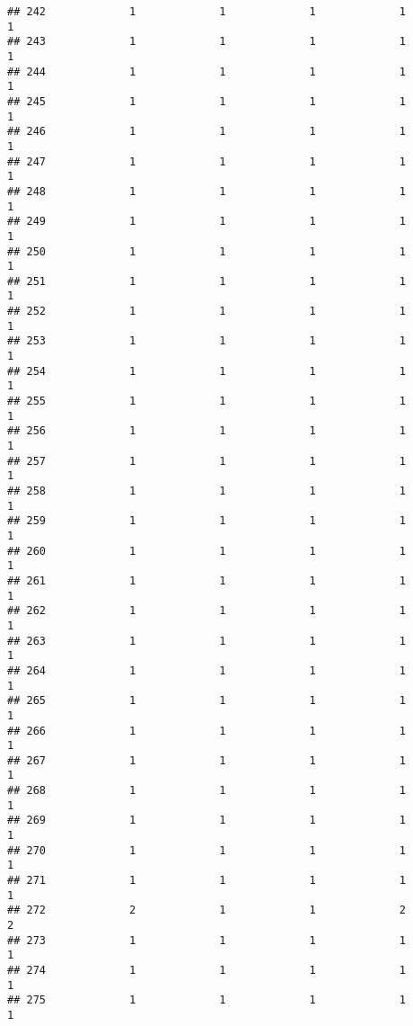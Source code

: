 \documentclass[
]{article}
\begin{document}
\begin{verbatim}
## 242             1             1             1             1             1
## 243             1             1             1             1             1
## 244             1             1             1             1             1
## 245             1             1             1             1             1
## 246             1             1             1             1             1
## 247             1             1             1             1             1
## 248             1             1             1             1             1
## 249             1             1             1             1             1
## 250             1             1             1             1             1
## 251             1             1             1             1             1
## 252             1             1             1             1             1
## 253             1             1             1             1             1
## 254             1             1             1             1             1
## 255             1             1             1             1             1
## 256             1             1             1             1             1
## 257             1             1             1             1             1
## 258             1             1             1             1             1
## 259             1             1             1             1             1
## 260             1             1             1             1             1
## 261             1             1             1             1             1
## 262             1             1             1             1             1
## 263             1             1             1             1             1
## 264             1             1             1             1             1
## 265             1             1             1             1             1
## 266             1             1             1             1             1
## 267             1             1             1             1             1
## 268             1             1             1             1             1
## 269             1             1             1             1             1
## 270             1             1             1             1             1
## 271             1             1             1             1             1
## 272             2             1             1             2             2
## 273             1             1             1             1             1
## 274             1             1             1             1             1
## 275             1             1             1             1             1

\end{verbatim}
\end{document}
